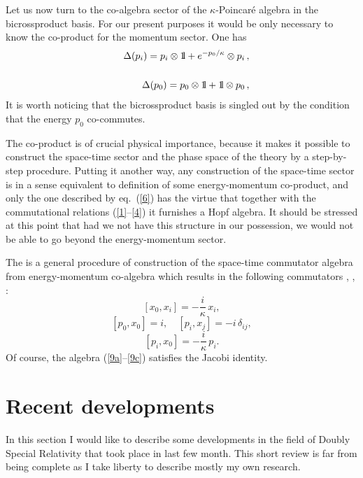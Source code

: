 \documentclass[a4paper,a4paper]{article}
\def\bbbone{{\mathchoice {\rm 1\mskip-4mu l} {\rm 1\mskip-4mu l}
{\rm 1\mskip-4.5mu l} {\rm 1\mskip-5mu l}}}
\begin{document}
Let us now turn to the co-algebra sector of the $\kappa$-Poincar\'e algebra in the bicrossproduct basis. For our present purposes it would be only necessary to know the co-product  for the momentum sector. One has
\begin{eqnarray}
\displaystyle
&& \Delta(p_{i}) = p_{i}\otimes \bbbone +
e^{-{p_{0}/ \kappa}} \otimes p_{i}\, ,
\cr\cr
\displaystyle
&& \Delta(p_{0}) = p_{0}\otimes \bbbone +  \bbbone \otimes p_{0}\, ,
\label{6}
\end{eqnarray}
It is worth noticing that the bicrossproduct basis is singled out by the condition that the energy $p_0$ co-commutes.

The co-product is of crucial physical importance, because it makes it possible to construct the space-time sector and the phase space of the theory by a step-by-step procedure.  Putting it another way, any construction of the space-time sector is in a sense equivalent to definition of some energy-momentum co-product, and only the one described by eq.~(\ref{6}) has the virtue that together with the commutational relations (\ref{1}--\ref{4}) it furnishes a Hopf algebra. It should be stressed at this point that had we not have this structure in our possession, we would not be able to go beyond the energy-momentum sector.

The is a general procedure of construction of the space-time
commutator algebra from energy-momentum  co-algebra
which results in the following commutators \cite{maru}, \cite{crossalg}, \cite{juse}:
\begin{equation}\label{9a}
[x_0, x_i] = -\frac{i}\kappa\, x_i,
\end{equation}
\begin{equation}\label{9b}
[p_0, x_0] = i, \quad [p_i, x_j] = -i \, \delta_{ij},
\end{equation}
\begin{equation}\label{9c}
 [p_i, x_0] = -\frac{i}\kappa\, p_i.
\end{equation}
Of course, the algebra (\ref{9a}--\ref{9c}) satisfies the Jacobi identity.

\section{Recent developments}

In this section I would like to describe some developments in the field of Doubly Special Relativity that took place in last few month. This short review is far from being complete as I take liberty to describe mostly my own research.
\end{document}
